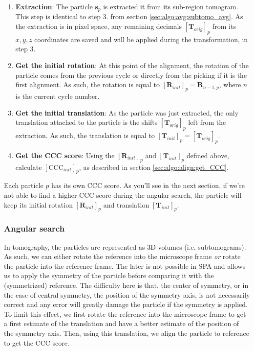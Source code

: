\begin{enumerate}
    \item \textbf{Extraction}: The particle $\bm{s}_{p}$ is extracted it from its sub-region tomogram. This step is identical to step 3. from section \ref{sec:algo:avg:subtomo_avg}. As the extraction is in pixel space, any remaining decimals ${[\bm{T}_{orig}]}_p$ from its $x,y,z$ coordinates are saved and will be applied during the transformation, in step 3.
    
    \item \textbf{Get the initial rotation}: At this point of the alignment, the rotation of the particle comes from the previous cycle or directly from the picking if it is the first alignment. As such, the rotation is equal to ${[\bm{R}_{init}]}_p = \bm{R}_{n-1,p}$, where $n$ is the current cycle number.
    
    \item \textbf{Get the initial translation}: As the particle was just extracted, the only translation attached to the particle is the shifts ${[\bm{T}_{orig}]}_p$ left from the extraction. As such, the translation is equal to ${[\bm{T}_{init}]}_p = {[\bm{T}_{orig}]}_p$.
    
    \item \textbf{Get the CCC score}: Using the ${[\bm{R}_{init}]}_{p}$ and ${[\bm{T}_{init}]}_{p}$ defined above, calculate ${[\bm{\mathrm{CCC}}_{init}]}_p$, as described in section \ref{sec:algo:align:get_CCC}.
\end{enumerate}

Each particle $p$ has its own CCC score. As you'll see in the next section, if we're not able to find a higher CCC score during the angular search, the particle will keep its initial rotation ${[\bm{R}_{init}]}_{p}$ and translation ${[\bm{T}_{init}]}_{p}$.

\subsubsection{Angular search} \label{sec:algo:align:angular_search}

In tomography, the particles are represented as 3D volumes (i.e. subtomograms). As such, we can either rotate the reference into the microscope frame \textit{or} rotate the particle into the reference frame. The later is not possible in SPA and allows us to apply the symmetry of the particle before comparing it with the (symmetrized) reference. The difficulty here is that, the center of symmetry, or in the case of central symmetry, the position of the symmetry axis, is not necessarily correct and any error will greatly damage the particle if the symmetry is applied. To limit this effect, we first rotate the reference into the microscope frame to get a first estimate of the translation and have a better estimate of the position of the symmetry axis. Then, using this translation, we align the particle to reference to get the CCC score.

